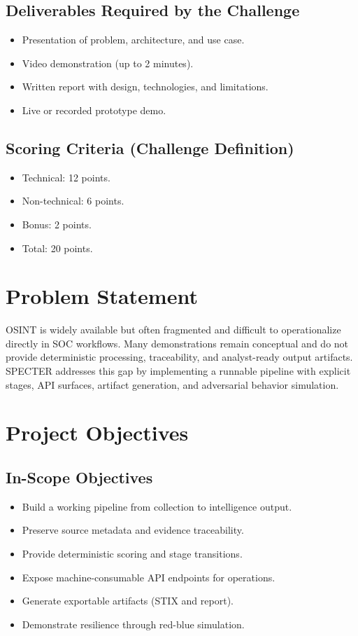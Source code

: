 \documentclass[11pt,a4paper]{article}
\begin{document}
\subsection{Deliverables Required by the Challenge}
\begin{itemize}[leftmargin=1.5em]
  \item Presentation of problem, architecture, and use case.
  \item Video demonstration (up to 2 minutes).
  \item Written report with design, technologies, and limitations.
  \item Live or recorded prototype demo.
\end{itemize}

\subsection{Scoring Criteria (Challenge Definition)}
\begin{itemize}[leftmargin=1.5em]
  \item Technical: 12 points.
  \item Non-technical: 6 points.
  \item Bonus: 2 points.
  \item Total: 20 points.
\end{itemize}

\section{Problem Statement}
OSINT is widely available but often fragmented and difficult to operationalize directly in SOC workflows. Many demonstrations remain conceptual and do not provide deterministic processing, traceability, and analyst-ready output artifacts. SPECTER addresses this gap by implementing a runnable pipeline with explicit stages, API surfaces, artifact generation, and adversarial behavior simulation.

\section{Project Objectives}
\subsection{In-Scope Objectives}
\begin{itemize}[leftmargin=1.5em]
  \item Build a working pipeline from collection to intelligence output.
  \item Preserve source metadata and evidence traceability.
  \item Provide deterministic scoring and stage transitions.
  \item Expose machine-consumable API endpoints for operations.
  \item Generate exportable artifacts (STIX and report).
  \item Demonstrate resilience through red-blue simulation.
\end{itemize}
\end{document}
